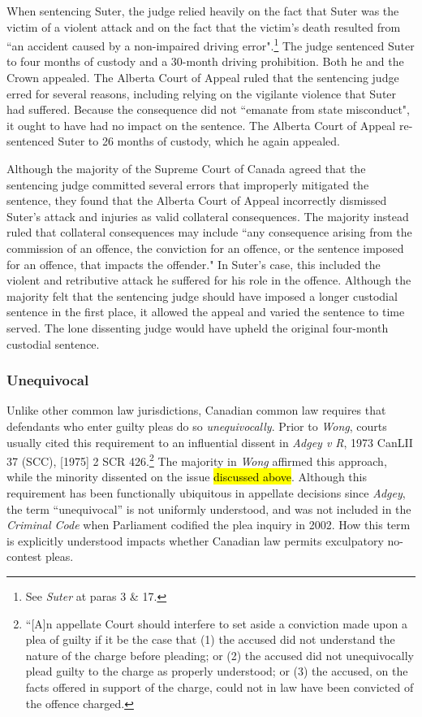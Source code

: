 When sentencing Suter, the judge relied heavily on the fact that Suter was the victim of a violent attack and on the fact that the victim's death resulted from ``an accident caused by a non-impaired driving error".\footnote{See \textit{Suter} at paras 3 \& 17.} The judge sentenced Suter to four months of custody and a 30-month driving prohibition. Both he and the Crown appealed. The Alberta Court of Appeal ruled that the sentencing judge erred for several reasons, including relying on the vigilante violence that Suter had suffered. Because the consequence did not ``emanate from state misconduct", it ought to have had no impact on the sentence. The Alberta Court of Appeal re-sentenced Suter to 26 months of custody, which he again appealed. 

Although the majority of the Supreme Court of Canada agreed that the sentencing judge committed several errors that improperly mitigated the sentence, they found that the Alberta Court of Appeal incorrectly dismissed Suter's attack and injuries as valid collateral consequences. The majority instead ruled that collateral consequences may include ``any consequence arising from the commission of an offence, the conviction for an offence, or the sentence imposed for an offence, that impacts the offender." In Suter's case, this included the violent and retributive attack he suffered for his role in the offence. Although the majority felt that the sentencing judge should have imposed a longer custodial sentence in the first place, it allowed the appeal and varied the sentence to time served. The lone dissenting judge would have upheld the original four-month custodial sentence.

\subsubsection{Unequivocal}

Unlike other common law jurisdictions, Canadian common law requires that defendants who enter guilty pleas do so \textit{unequivocally}. Prior to \textit{Wong}, courts usually cited this requirement to an influential dissent in \textit{Adgey v R}, 1973 CanLII 37 (SCC), [1975] 2 SCR 426.\footnote{``[A]n appellate Court should interfere to set aside a conviction made upon a plea of guilty if it be the case that (1) the accused did not understand the nature of the charge before pleading; or (2) the accused did not unequivocally plead guilty to the charge as properly understood; or (3) the accused, on the facts offered in support of the charge, could not in law have been convicted of the offence charged.} The majority in \textit{Wong} affirmed this approach, while the minority dissented on the issue \hl{discussed above}. Although this requirement has been functionally ubiquitous in appellate decisions since \textit{Adgey}, the term ``unequivocal'' is not uniformly understood, and was not included in the \textit{Criminal Code} when Parliament codified the plea inquiry in 2002. How this term is explicitly understood impacts whether Canadian law permits exculpatory no-contest pleas. 

